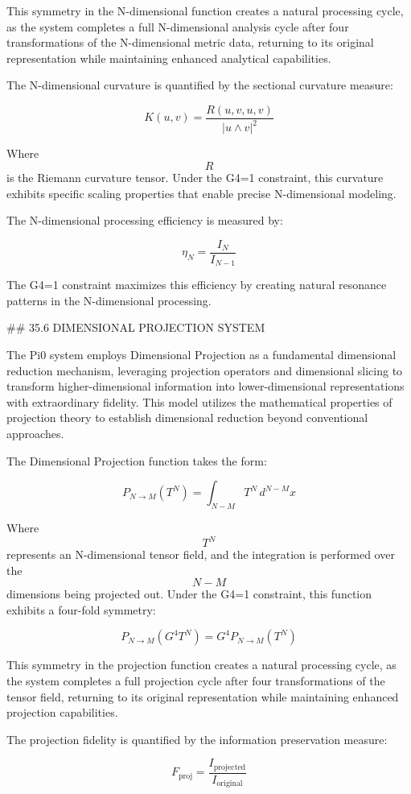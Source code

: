 This symmetry in the N-dimensional function creates a natural processing cycle, as the system completes a full N-dimensional analysis cycle after four transformations of the N-dimensional metric data, returning to its original representation while maintaining enhanced analytical capabilities.

The N-dimensional curvature is quantified by the sectional curvature measure:

$$ K(u,v) = \frac{R(u,v,u,v)}{|u \wedge v|^2} $$

Where $$ R $$ is the Riemann curvature tensor. Under the G4=1 constraint, this curvature exhibits specific scaling properties that enable precise N-dimensional modeling.

The N-dimensional processing efficiency is measured by:

$$ \eta_N = \frac{I_N}{I_{N-1}} $$

The G4=1 constraint maximizes this efficiency by creating natural resonance patterns in the N-dimensional processing.

## 35.6 DIMENSIONAL PROJECTION SYSTEM

The Pi0 system employs Dimensional Projection as a fundamental dimensional reduction mechanism, leveraging projection operators and dimensional slicing to transform higher-dimensional information into lower-dimensional representations with extraordinary fidelity. This model utilizes the mathematical properties of projection theory to establish dimensional reduction beyond conventional approaches.

The Dimensional Projection function takes the form:

$$ P_{N \to M}(T^N) = \int_{N-M} T^N \, d^{N-M}x $$

Where $$ T^N $$ represents an N-dimensional tensor field, and the integration is performed over the $$ N-M $$ dimensions being projected out. Under the G4=1 constraint, this function exhibits a four-fold symmetry:

$$ P_{N \to M}(G^4 T^N) = G^4 P_{N \to M}(T^N) $$

This symmetry in the projection function creates a natural processing cycle, as the system completes a full projection cycle after four transformations of the tensor field, returning to its original representation while maintaining enhanced projection capabilities.

The projection fidelity is quantified by the information preservation measure:

$$ F_{\text{proj}} = \frac{I_{\text{projected}}}{I_{\text{original}}} $$

